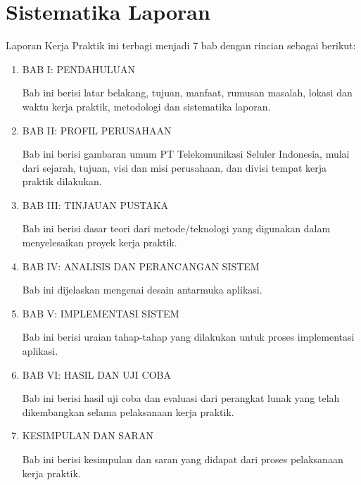 \section{Sistematika Laporan}
Laporan Kerja Praktik ini terbagi menjadi 7 bab dengan rincian sebagai berikut:
	\begin{enumerate}
	\item BAB I: PENDAHULUAN
	
	Bab ini berisi latar belakang, tujuan, manfaat, rumusan masalah, lokasi dan waktu kerja praktik, metodologi dan sistematika laporan.
		
	\item BAB II: PROFIL PERUSAHAAN
		
	Bab ini berisi gambaran umum PT Telekomunikasi Seluler Indonesia, mulai dari sejarah, tujuan, visi dan misi perusahaan, dan divisi tempat kerja praktik dilakukan.
		
	\item BAB III: TINJAUAN PUSTAKA
		
	Bab ini berisi dasar teori dari metode/teknologi yang digunakan dalam menyelesaikan proyek kerja praktik.
		
	\item BAB IV: ANALISIS DAN PERANCANGAN SISTEM
		
	Bab ini dijelaskan mengenai desain antarmuka aplikasi.
		
	\item BAB V: IMPLEMENTASI SISTEM
		
	Bab ini berisi uraian tahap-tahap yang dilakukan untuk proses implementasi aplikasi.
		
	\item BAB VI: HASIL DAN UJI COBA
	
	Bab ini berisi hasil uji coba dan evaluasi dari perangkat lunak yang telah dikembangkan selama pelaksanaan kerja praktik.
	
	\item KESIMPULAN DAN SARAN
	
	Bab ini berisi kesimpulan dan saran yang didapat dari proses pelaksanaan kerja praktik.
	\end{enumerate}

\cleardoublepage
